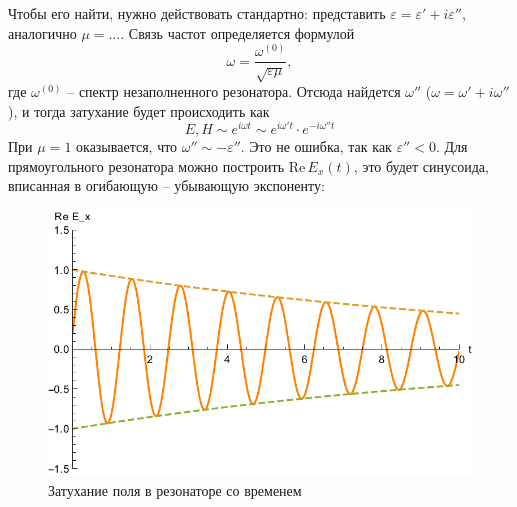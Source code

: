 Чтобы его найти, нужно действовать стандартно: представить 
$\varepsilon=\varepsilon'+i \varepsilon''$, аналогично $\mu=\ldots$. Связь частот определяется формулой
\begin{equation}
	\omega=\frac{\omega^{(0)}}{\sqrt{\varepsilon \mu}},
\end{equation}
где $\omega^{(0)}$ -- спектр незаполненного резонатора. Отсюда найдется $\omega''$ ($\omega=\omega'+i \omega''$), и тогда затухание будет происходить как 
\begin{equation}
	E,H  \sim e^{i \omega t} \sim e^{i \omega' t}\cdot e^{-i \omega'' t}
\end{equation}
При $\mu=1$ оказывается, что $\omega''\sim -\varepsilon''$. Это не ошибка, так как $\varepsilon''<0$. %
Для прямоугольного резонатора можно построить $\mathrm{Re}\, E_x(t)$, это будет синусоида, вписанная в огибающую -- убывающую экспоненту: 
\begin{figure}[H]
	\centering
	\includegraphics[scale=0.8]{img2/exp.pdf}
	\caption{Затухание поля в резонаторе со временем}
	\label{fig:figure1}
\end{figure}
